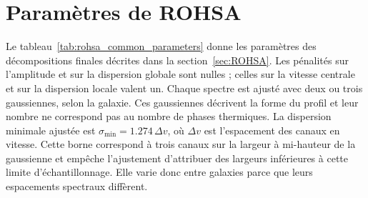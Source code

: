 \chapter[Paramètres de ROHSA]{Paramètres de ROHSA}
\label{app:rohsa}

Le tableau~\ref{tab:rohsa_common_parameters} donne les paramètres des décompositions finales décrites dans la section~\ref{sec:ROHSA}. Les pénalités sur l'amplitude et sur la dispersion globale sont nulles ; celles sur la vitesse centrale et sur la dispersion locale valent un. Chaque spectre est ajusté avec deux ou trois gaussiennes, selon la galaxie. Ces gaussiennes décrivent la forme du profil et leur nombre ne correspond pas au nombre de phases thermiques. La dispersion minimale ajustée est $\sigma_{\min}=1.274\,\Delta v$, où $\Delta v$ est l'espacement des canaux en vitesse. Cette borne correspond à trois canaux sur la largeur à mi-hauteur de la gaussienne et empêche l'ajustement d'attribuer des largeurs inférieures à cette limite d'échantillonnage. Elle varie donc entre galaxies parce que leurs espacements spectraux diffèrent.


